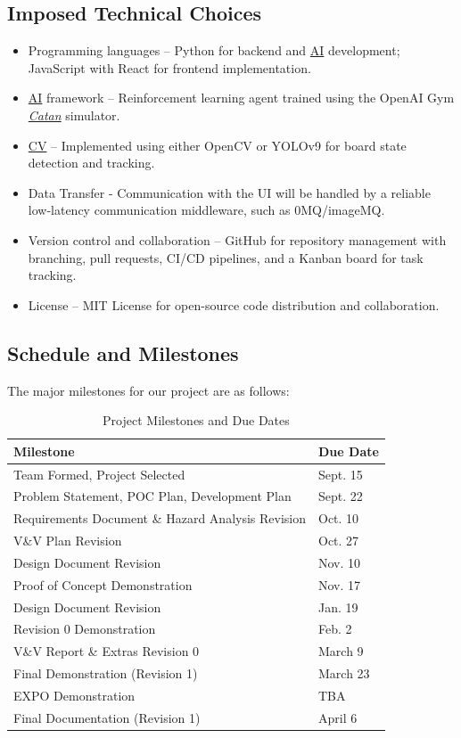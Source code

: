 \documentclass{article}
\newcommand{\Catan}{\href{https://en.wikipedia.org/wiki/Catan}{Catan}}
\newcommand{\AI}{\href{https://en.wikipedia.org/wiki/Artificial_intelligence}{AI}}
\newcommand{\CV}{\href{https://www.ibm.com/think/topics/computer-vision}{CV}}
\begin{document}
\subsection{Imposed Technical Choices}\label{subsec:technicalchoices}
\begin{itemize}
    \item {Programming languages} – Python for backend and \AI{} development; JavaScript with React for frontend implementation.
    \item {\AI{} framework} – Reinforcement learning agent trained using the OpenAI Gym \emph{\Catan{}} simulator.
    \item {\CV{}} – Implemented using either OpenCV or YOLOv9 for board state detection and tracking.
    \item {Data Transfer} - Communication with the UI will be handled by a reliable low-latency communication middleware, such as 0MQ/imageMQ.

    \item {Version control and collaboration} – GitHub for repository management with branching, pull requests, CI/CD pipelines, and a Kanban board for task tracking.
    \item {License} – MIT License for open-source code distribution and collaboration.
\end{itemize}

\subsection{Schedule and Milestones}\label{subsec:schedule}
\medskip
The major milestones for our project are as follows:
\begin{table}[H]
  \centering
  \begin{tabular}{|l|l|}
  \hline
  \textbf{Milestone} & \textbf{Due Date} \\ \hline
  Team Formed, Project Selected & Sept. 15 \\ \hline
  Problem Statement, POC Plan, Development Plan & Sept. 22 \\ \hline
  Requirements Document \& Hazard Analysis Revision & Oct. 10 \\ \hline
  V\&V Plan Revision & Oct. 27 \\ \hline
  Design Document Revision & Nov. 10 \\ \hline
  Proof of Concept Demonstration & Nov. 17 \\ \hline
  Design Document Revision & Jan. 19 \\ \hline
  Revision 0 Demonstration & Feb. 2 \\ \hline
  V\&V Report \& Extras Revision 0 & March 9 \\ \hline
  Final Demonstration (Revision 1) & March 23 \\ \hline
  EXPO Demonstration & TBA \\ \hline
  Final Documentation (Revision 1) & April 6 \\ \hline
  
  \end{tabular}
  \caption{Project Milestones and Due Dates}
  \label{tab:project-milestones}
  \end{table}
\end{document}
